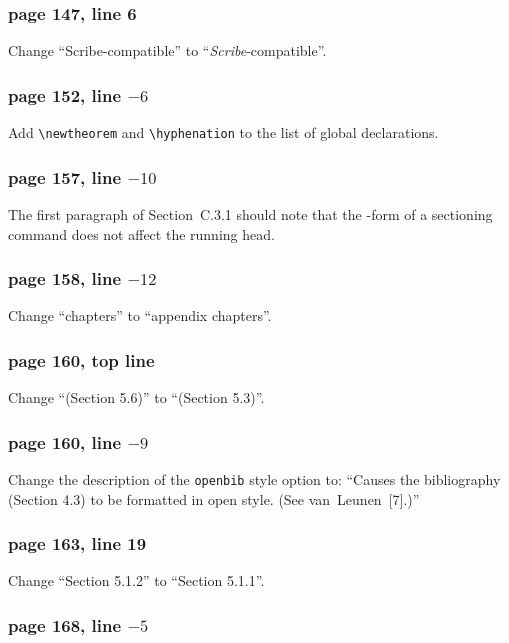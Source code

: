 \subsubsection*{page 147, line 6}
 
Change ``Scribe-compatible'' to ``{\em Scribe\/}-compatible''.
 
\subsubsection*{page 152, line $-6$}
Add \verb|\newtheorem| and \verb|\hyphenation| to the list
of global declarations.
 
 
\subsubsection*{page 157, line $-10$}
The first paragraph of Section~C.3.1 should note that the {\tt *}-form
of a sectioning command does not affect the running head.
 
 
\subsubsection*{page 158, line $-12$}
Change ``chapters'' to ``appendix chapters''.
 
\subsubsection*{page 160, top line}
 
Change ``(Section 5.6)'' to ``(Section 5.3)''.
 
\subsubsection*{page 160, line $-9$}
 
Change the description of the {\tt openbib} style option to: ``Causes
the bibliography (Section 4.3) to be formatted in open style.  (See
van~Leunen~[7].)''
 
 
\subsubsection*{page 163, line 19}
Change ``Section 5.1.2'' to ``Section 5.1.1''.
 
\subsubsection*{page 168, line $-5$}
 
